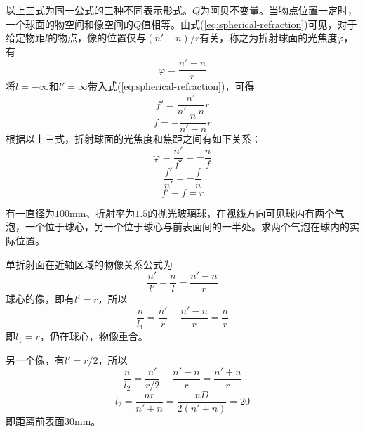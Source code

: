 \documentclass[cn,10pt,chinesefont=founder,math=mtpro2,cite=super,toc=onecol,twoside,openany]{elegantbook}
\begin{document}
以上三式为同一公式的三种不同表示形式。$Q$为阿贝不变量。当物点位置一定时，一个球面的物空间和像空间的$Q$值相等。由式(\ref{eq:spherical-refraction})可见，对于给定物距$l$的物点，像的位置仅与$(n'-n)/r$有关，称之为折射球面的光焦度$\varphi$，有
\begin{equation}
\varphi=\frac{n'-n}{r}
\end{equation}
将$l=-\infty$和$l'=\infty$带入式(\ref{eq:spherical-refraction})，可得
\begin{equation}
f'=\frac{n'}{n'-n}r
\label{eq:spherical-image-focal-length}
\end{equation}
\begin{equation}
f=-\frac{n}{n'-n}r
\label{eq:spherical-object-focal-length}
\end{equation}
根据以上三式，折射球面的光焦度和焦距之间有如下关系：
\begin{equation}
\varphi=\frac{n'}{f'}=-\frac{n}{f}
\end{equation}
\begin{equation}
\frac{f'}{n'}=-\frac{f}{n}
\end{equation}
\begin{equation}
f'+f=r
\end{equation}

\begin{problem}
	有一直径为$100\mathrm{mm}$、折射率为$1.5$的抛光玻璃球，在视线方向可见球内有两个气泡，一个位于球心，另一个位于球心与前表面间的一半处。求两个气泡在球内的实际位置。
\end{problem}
\begin{solution}
	单折射面在近轴区域的物像关系公式为
	\begin{equation}
	\frac{n'}{l'}-\frac{n}{l}=\frac{n'-n}{r}
	\end{equation}
	球心的像，即有$l'=r$，所以
	\begin{equation}
	\frac{n}{l_1}=\frac{n'}{r}-\frac{n'-n}{r}=\frac{n}{r}
	\end{equation}
	即$l_1=r$，仍在球心，物像重合。
	
	另一个像，有$l'=r/2$，所以
	\begin{equation}
	\frac{n}{l_2}=\frac{n'}{r/2}-\frac{n'-n}{r}=\frac{n'+n}{r}
	\end{equation}
	\begin{equation}
	l_2=\frac{nr}{n'+n}=\frac{nD}{2(n'+n)}=20
	\end{equation}
	即距离前表面$30\mathrm{mm}$。
\end{solution}
\end{document}
